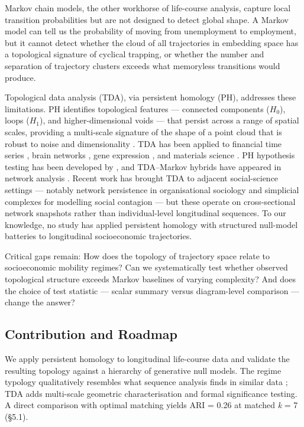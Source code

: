Markov chain models, the other workhorse of life-course analysis, capture local transition probabilities but are not designed to detect global shape. A Markov model can tell us the probability of moving from unemployment to employment, but it cannot detect whether the cloud of all trajectories in embedding space has a topological signature of cyclical trapping, or whether the number and separation of trajectory clusters exceeds what memoryless transitions would produce.

Topological data analysis (TDA), via persistent homology (PH), addresses these limitations. PH identifies topological features --- connected components ($H_0$), loops ($H_1$), and higher-dimensional voids --- that persist across a range of spatial scales, providing a multi-scale signature of the shape of a point cloud that is robust to noise and dimensionality \citep{carlsson2009topology, edelsbrunner2010computational}. TDA has been applied to financial time series \citep{gidea2018topological}, brain networks \citep{saggar2018towards}, gene expression \citep{rizvi2017single}, and materials science \citep{hiraoka2016hierarchical}. PH hypothesis testing has been developed by \citet{robinson2017hypothesis}, and TDA--Markov hybrids have appeared in network analysis \citep{stolz2017persistent}. Recent work has brought TDA to adjacent social-science settings --- notably network persistence in organisational sociology \citep{sizemore2018importance} and simplicial complexes for modelling social contagion \citep{iacopini2019simplicial} --- but these operate on cross-sectional network snapshots rather than individual-level longitudinal sequences. To our knowledge, no study has applied persistent homology with structured null-model batteries to longitudinal socioeconomic trajectories.

Critical gaps remain: How does the topology of trajectory space relate to socioeconomic mobility regimes? Can we systematically test whether observed topological structure exceeds Markov baselines of varying complexity? And does the choice of test statistic --- scalar summary versus diagram-level comparison --- change the answer?

\subsection{Contribution and Roadmap}

We apply persistent homology to longitudinal life-course data and validate the resulting topology against a hierarchy of generative null models. The regime typology qualitatively resembles what sequence analysis finds in similar data \citep[e.g.,][]{bukodi2019social}; TDA adds multi-scale geometric characterisation and formal significance testing. A direct comparison with optimal matching yields ARI = 0.26 at matched \textit{k} = 7 (\S5.1).

